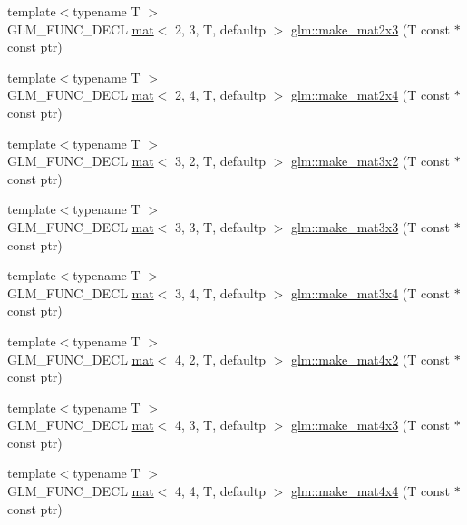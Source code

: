 \begin{DoxyCompactItemize}
{\footnotesize template$<$typename T $>$ }\\G\+L\+M\+\_\+\+F\+U\+N\+C\+\_\+\+D\+E\+CL \hyperlink{structglm_1_1mat}{mat}$<$ 2, 3, T, defaultp $>$ \hyperlink{group__gtc__type__ptr_ga21982104164789cf8985483aaefc25e8}{glm\+::make\+\_\+mat2x3} (T const $\ast$const ptr)
\item 
{\footnotesize template$<$typename T $>$ }\\G\+L\+M\+\_\+\+F\+U\+N\+C\+\_\+\+D\+E\+CL \hyperlink{structglm_1_1mat}{mat}$<$ 2, 4, T, defaultp $>$ \hyperlink{group__gtc__type__ptr_ga078b862c90b0e9a79ed43a58997d8388}{glm\+::make\+\_\+mat2x4} (T const $\ast$const ptr)
\item 
{\footnotesize template$<$typename T $>$ }\\G\+L\+M\+\_\+\+F\+U\+N\+C\+\_\+\+D\+E\+CL \hyperlink{structglm_1_1mat}{mat}$<$ 3, 2, T, defaultp $>$ \hyperlink{group__gtc__type__ptr_ga27a24e121dc39e6857620e0f85b6e1a8}{glm\+::make\+\_\+mat3x2} (T const $\ast$const ptr)
\item 
{\footnotesize template$<$typename T $>$ }\\G\+L\+M\+\_\+\+F\+U\+N\+C\+\_\+\+D\+E\+CL \hyperlink{structglm_1_1mat}{mat}$<$ 3, 3, T, defaultp $>$ \hyperlink{group__gtc__type__ptr_gaf2e8337b15c3362aaeb6e5849e1c0536}{glm\+::make\+\_\+mat3x3} (T const $\ast$const ptr)
\item 
{\footnotesize template$<$typename T $>$ }\\G\+L\+M\+\_\+\+F\+U\+N\+C\+\_\+\+D\+E\+CL \hyperlink{structglm_1_1mat}{mat}$<$ 3, 4, T, defaultp $>$ \hyperlink{group__gtc__type__ptr_ga05dd66232aedb993e3b8e7b35eaf932b}{glm\+::make\+\_\+mat3x4} (T const $\ast$const ptr)
\item 
{\footnotesize template$<$typename T $>$ }\\G\+L\+M\+\_\+\+F\+U\+N\+C\+\_\+\+D\+E\+CL \hyperlink{structglm_1_1mat}{mat}$<$ 4, 2, T, defaultp $>$ \hyperlink{group__gtc__type__ptr_ga8b34c9b25bf3310d8ff9c828c7e2d97c}{glm\+::make\+\_\+mat4x2} (T const $\ast$const ptr)
\item 
{\footnotesize template$<$typename T $>$ }\\G\+L\+M\+\_\+\+F\+U\+N\+C\+\_\+\+D\+E\+CL \hyperlink{structglm_1_1mat}{mat}$<$ 4, 3, T, defaultp $>$ \hyperlink{group__gtc__type__ptr_ga0330bf6640092d7985fac92927bbd42b}{glm\+::make\+\_\+mat4x3} (T const $\ast$const ptr)
\item 
{\footnotesize template$<$typename T $>$ }\\G\+L\+M\+\_\+\+F\+U\+N\+C\+\_\+\+D\+E\+CL \hyperlink{structglm_1_1mat}{mat}$<$ 4, 4, T, defaultp $>$ \hyperlink{group__gtc__type__ptr_ga8f084be30e404844bfbb4a551ac2728c}{glm\+::make\+\_\+mat4x4} (T const $\ast$const ptr)

\end{DoxyCompactItemize}
